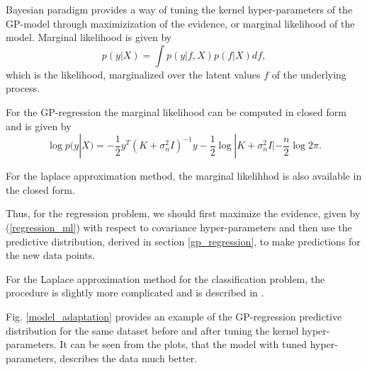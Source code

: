 Bayesian paradigm provides a way of tuning the kernel hyper-parameters of the GP-model through maximizization of the evidence, or marginal likelihood of the model. Marginal likelihood is given by
$$p(y | X) = \int p(y | f, X) p(f | X) df,$$
which is the likelihood, marginalized over the latent values $f$ of the underlying process.

For the GP-regression the marginal likelihood can be computed in closed form and is given by
\begin{equation}
	\label{regression_ml}
	\log p(y | X) = -\frac 1 2 y^{T} (K + \sigma_n^2 I)^{-1} y - \frac 1 2 \log |K + \sigma_n^2 I| - \frac n 2 \log 2 \pi.
\end{equation}

For the laplace approximation method, the marginal likelihhod is also available in the closed form. 

Thus, for the regression problem, we should first maximize the evidence, given by (\ref{regression_ml}) with respect to covariance hyper-parameters and then use the predictive distribution, derived in section \ref{gp_regression}, to make predictions for the new data points.

For the Laplace approximation method for the classification problem, the procedure is slightly more complicated and is described in \cite{GPinML}.

Fig. \ref{model_adaptation} provides an example of the GP-regression predictive distribution for the same dataset before and after tuning the kernel hyper-parameters. It can be seen from the plots, that the model with tuned hyper-parameters, describes the data much better.